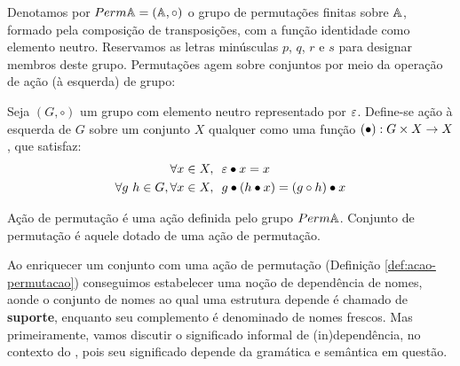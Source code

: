 Denotamos por $Perm \mathbb{A} = (\mathbb{A}, \circ)$ o grupo de permutações finitas sobre $\mathbb{A}$, formado pela composição de transposições, com a função identidade como elemento neutro. Reservamos as letras minúsculas $p$, $q$, $r$ e $s$ para designar membros deste grupo. Permutações agem sobre conjuntos por meio da operação de ação (à esquerda) de grupo:
\begin{definicao}
	Seja $(G, \circ)$ um grupo com elemento neutro representado por $\varepsilon$.  Define-se ação à esquerda de $G$ sobre um conjunto $X$ qualquer como uma função $(\bullet) : G \times X \rightarrow X$,
	que satisfaz:
	\begin{align}
		\forall x \in X,&~~ \varepsilon \bullet x = x \label{eq:act-neutral}\\
		\forall g~h \in G, \forall x \in X,&~~ g \bullet (h \bullet x) = (g \circ h) \bullet x \label{eq:act-compat}
	\end{align}
\end{definicao}\noindent
\begin{definicao}\label{def:acao-permutacao}
	Ação de permutação é uma ação definida pelo grupo $Perm \mathbb{A}$. Conjunto de permutação é aquele dotado de uma ação de permutação.
\end{definicao}\noindent

Ao enriquecer um conjunto com uma ação de permutação (Definição \ref{def:acao-permutacao}) conseguimos estabelecer uma noção de dependência de nomes, aonde o conjunto de nomes ao qual uma estrutura depende é chamado de \textbf{suporte}, enquanto seu complemento é denominado de nomes frescos.
Mas primeiramente, vamos discutir o significado informal de (in)dependência, no contexto do \lcalc, pois seu significado depende da gramática e semântica em questão.

